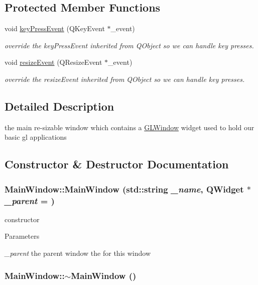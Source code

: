 \subsection*{Protected Member Functions}
\begin{DoxyCompactItemize}
\item 
void \hyperlink{classMainWindow_a3c2e352934c6318d405c3d2b0e07729c}{keyPressEvent} (QKeyEvent $\ast$\_\-event)
\begin{DoxyCompactList}\small\item\em override the keyPressEvent inherited from QObject so we can handle key presses. \item\end{DoxyCompactList}\item 
void \hyperlink{classMainWindow_a8ed35ee3d9b815ed32c11d1e13957503}{resizeEvent} (QResizeEvent $\ast$\_\-event)
\begin{DoxyCompactList}\small\item\em override the resizeEvent inherited from QObject so we can handle key presses. \item\end{DoxyCompactList}\end{DoxyCompactItemize}


\subsection{Detailed Description}
the main re-\/sizable window which contains a \hyperlink{classGLWindow}{GLWindow} widget used to hold our basic gl applications 

\subsection{Constructor \& Destructor Documentation}
\hypertarget{classMainWindow_a46c320729b0e05c9fbb29bc3a0378aed}{
\subsubsection[{MainWindow}]{\setlength{\rightskip}{0pt plus 5cm}MainWindow::MainWindow (std::string {\em \_\-name}, \/  QWidget $\ast$ {\em \_\-parent} = {})}}
\label{classMainWindow_a46c320729b0e05c9fbb29bc3a0378aed}


constructor 
\begin{DoxyParams}{Parameters}
\item[{\em \_\-parent}]the parent window the for this window \end{DoxyParams}
\hypertarget{classMainWindow_ae98d00a93bc118200eeef9f9bba1dba7}{
\subsubsection[{$\sim$MainWindow}]{\setlength{\rightskip}{0pt plus 5cm}MainWindow::$\sim$MainWindow ()}}
\label{classMainWindow_ae98d00a93bc118200eeef9f9bba1dba7}


